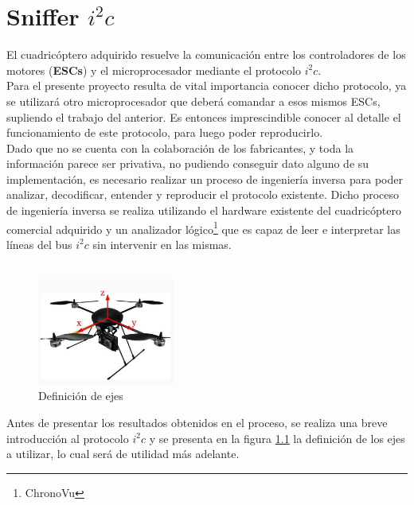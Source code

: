 \documentclass[spanish,12pt,a4paper,titlepage]{report}
\begin{document}
\chapter{Sniffer $i^2c$}

El cuadricóptero adquirido resuelve la comunicación entre los controladores de los motores (\textbf{ESCs}) y el microprocesador mediante el protocolo $i^2c$.\\

Para el presente proyecto resulta de vital importancia conocer dicho protocolo, ya se utilizará otro microprocesador que deberá comandar a esos mismos ESCs, supliendo el trabajo del anterior. Es entonces imprescindible conocer al detalle el funcionamiento de este protocolo, para luego poder reproducirlo.\\

Dado que no se cuenta con la colaboración de los fabricantes, y toda la información parece ser privativa, no pudiendo conseguir dato alguno de su implementación, es necesario realizar un proceso de ingeniería inversa para poder analizar, decodificar, entender y reproducir el protocolo existente. Dicho proceso de ingeniería inversa se realiza utilizando el hardware existente del cuadricóptero comercial adquirido y un analizador lógico\footnote{ChronoVu} que es capaz de leer e interpretar las líneas del bus $i^2c$ sin intervenir en las mismas.\\ \\

\begin{figure}
	\vspace{-40pt}
	\begin{center}
	\includegraphics[width=0.4\textwidth]{./pics/ejes_quad.jpg}
	\end{center}
	\vspace{-20pt}
	\caption{Definición de ejes}
	\label{fig:ejes_quad}
	\vspace{-70pt}
\end{figure}

Antes de presentar los resultados obtenidos en el proceso, se realiza una breve introducción al protocolo $i^2c$ y se presenta en la figura \ref{fig:ejes_quad} la definición de los ejes a utilizar, lo cual será de utilidad más adelante.
\end{document}
